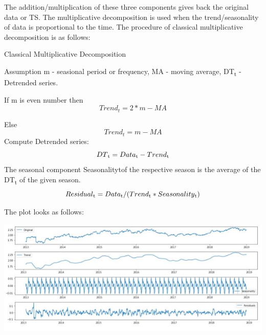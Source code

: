 			The addition/multiplication of these three components gives back the original data or TS. The multiplicative decomposition is used when the trend/seasonality of data is proportional to the time.
			The procedure of classical multiplicative decomposition \cite{18} is as follows:

				\begin{algorithm}[H]
					\caption{Classical Multiplicative Decomposition}
					Assumption m - seasional period or frequency, 
	        						MA - moving average, 
	       						DT\textsubscript{t} - Detrended series.

					\begin{algorithmic}[1] 
						\STATE If m is even number then \begin{equation}Trend_{t} = 2 * m-MA		\end{equation}

								Else \begin{equation}Trend_{t} = m-MA	\end{equation}
						\STATE Compute Detrended series:
									\begin{equation}DT\textsubscript{t} = Data\textsubscript{t} - Trend\textsubscript{t} \end{equation}
						\STATE The seasonal component Seasonalitytof the respective season is the average of the DT\textsubscript{t} of the given season.
						\STATE \begin{equation}Residual\textsubscript{t} = Data\textsubscript{t} / (Trend\textsubscript{t}  * Seasonality\textsubscript{t})	\end{equation}
					\end{algorithmic}
				\end{algorithm}

			The plot looks as follows:
				
				\begin{center}
				\includegraphics[width=\linewidth]{figures/The-trend-seasonality-and-residual-of-log-transformed-data.jpg}	
				\label{fig: The trend, seasonality and residual of log-transformed data}
				\end{center}

